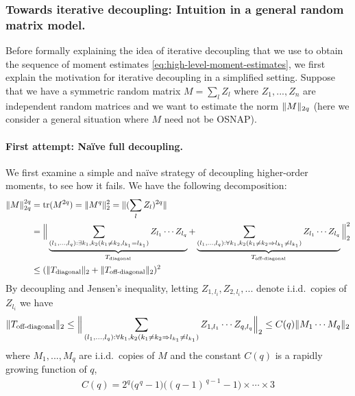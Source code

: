 \documentclass[11pt]{amsart}
\numberwithin{equation}{section}
\numberwithin{equation}{section}
\DeclareMathOperator*{\tr}{tr}
\DeclarePairedDelimiter{\norm}{\lVert}{\rVert}
\begin{document}
\subsubsection{Towards iterative decoupling: Intuition in a general random matrix model.}
\label{subsubsec:itergen}

Before formally explaining the idea of iterative decoupling that we use to obtain the sequence of moment estimates \eqref{eq:high-level-moment-estimates}, we first explain the motivation for iterative decoupling in a simplified setting. Suppose that we have a symmetric random matrix $M=\sum_lZ_l$ where $Z_1,...,Z_n$ are independent random matrices and we want to estimate the norm $\norm{M}_{2q}$ (here we consider a general situation where $M$ need not be OSNAP).

\paragraph{\textbf{First attempt: Na\"ive full decoupling.}} We first examine a simple and na\"ive strategy of decoupling higher-order moments, to see how it fails. We have the following decomposition:
\begin{align*}
    \norm{M}_{2q}^{2q}&=\tr(M^{2q})
    =\norm{M^{q}}_2^2
    =\norm{(\sum \limits_{l}Z_l)^{2q}}
    \\&=\Big\|\underbrace{\sum \limits_{(l_1,...,l_{q}):\exists k_1,k_2( k_1 \ne k_2,l_{k_1} = l_{k_1})}Z_{l_1} \cdots Z_{l_{q}}}_{T_{\text{diagonal}}}+\underbrace{\sum \limits_{(l_1,...,l_{q}):\forall k_1,k_2( k_1 \ne k_2 \Rightarrow l_{k_1}  \ne l_{k_1})}Z_{l_1} \cdots Z_{l_{q}}}_{T_{\text{off-diagonal}}}\Big\|_2^2
    \\ &\le  (\norm{T_{\text{diagonal}}}_2+\norm{T_{\text{off-diagonal}}}_2)^2
\end{align*}
By decoupling \cite{de2012decoupling} and Jensen's inequality, letting $Z_{1,l_i},Z_{2,l_i},...$ denote i.i.d.\ copies of $Z_{l_i}$ we have
\begin{align*}
    \norm{T_{\text{off-diagonal}}}_2 \le \Big\|\sum \limits_{(l_1,...,l_{q}):\forall k_1,k_2( k_1 \ne k_2 \Rightarrow l_{k_1}  \ne l_{k_1})}Z_{1,l_1} \cdots Z_{q,l_{q}}\Big\|_2
     \le  C({q})\norm{M_1 \cdots M_{q}}_2
\end{align*}
where $M_1,...,M_{q}$ are i.i.d.\ copies of $M$ and the constant $C({q})$ is a rapidly growing function of $q$,
\begin{align*}
    C(q) =2^{q}\bigl(q^{\,q}-1\bigr)\bigl((q-1)^{\,q-1}-1\bigr)\times\cdots\times 3
\end{align*}
\end{document}
